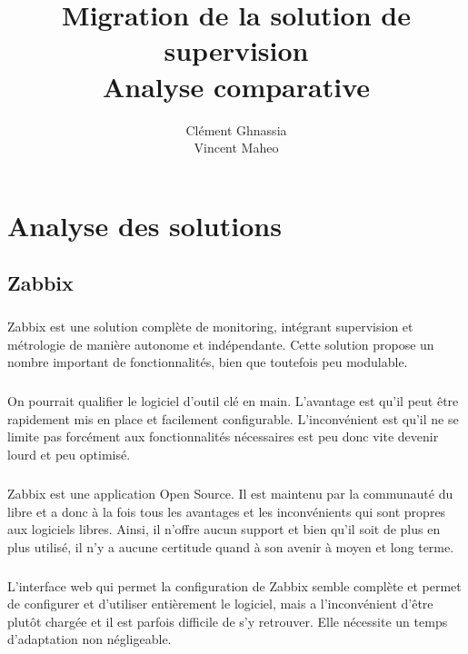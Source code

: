 \documentclass[a4paper,12pt]{report}
\title{Migration de la solution de supervision\\Analyse comparative}
\author{Clément Ghnassia\\Vincent Maheo}
\begin{document}
\maketitle
\tableofcontents

\chapter{Analyse des solutions}

\section{Zabbix}

\paragraph{}
Zabbix est une solution complète de monitoring, intégrant supervision et métrologie de manière autonome et indépendante. Cette solution propose un nombre important de fonctionnalités, bien que toutefois peu modulable.

\paragraph{}
On pourrait qualifier le logiciel d'outil clé en main. L'avantage est qu'il peut être rapidement mis en place et facilement configurable. L'inconvénient est qu'il ne se limite pas forcément aux fonctionnalités nécessaires est peu donc vite devenir lourd et peu optimisé.

\paragraph{}
Zabbix est une application Open Source. Il est maintenu par la communauté du libre et a donc à la fois tous les avantages et les inconvénients qui sont propres aux logiciels libres. Ainsi, il n'offre aucun support et bien qu'il soit de plus en plus utilisé, il n'y a aucune certitude quand à son avenir à moyen et long terme.

\paragraph{}
L'interface web qui permet la configuration de Zabbix semble complète et permet de configurer et d'utiliser entièrement le logiciel, mais a l'inconvénient d'être plutôt chargée et il est parfois difficile de s'y retrouver. Elle nécessite un temps d'adaptation non négligeable.
\end{document}
